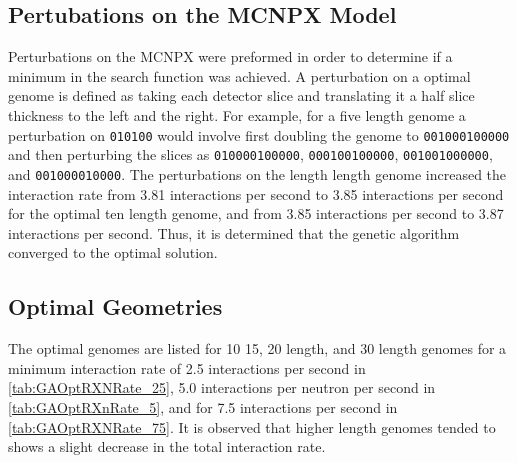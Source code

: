\subsection{Pertubations on the MCNPX Model}
Perturbations on the MCNPX were preformed in order to determine if a minimum in the search function was achieved.
A perturbation on a optimal genome is defined as taking each detector slice and translating it a half slice thickness to the left and the right. 
For example, for a five length genome a perturbation on \verb+010100+ would involve first doubling the genome to  \verb+001000100000+ and then perturbing the slices as  \verb+010000100000+, \verb+000100100000+, \verb+001001000000+, and \verb+001000010000+.
The perturbations on the length length genome increased the interaction rate from 3.81 interactions per second to 3.85 interactions per second for the optimal ten length genome, and from 3.85 interactions per second to 3.87 interactions per second.
Thus, it is determined that the genetic algorithm converged to the optimal solution.

\subsection{Optimal Geometries}
The optimal genomes are listed for 10 15, 20 length, and 30 length genomes for a minimum interaction rate of 2.5 interactions per second in \autoref{tab:GAOptRXNRate_25}, 5.0 interactions per neutron per second in \autoref{tab:GAOptRXnRate_5}, and for 7.5 interactions per second in \autoref{tab:GAOptRXNRate_75}.
It is observed that higher length genomes tended to shows a slight decrease in the total interaction rate.


